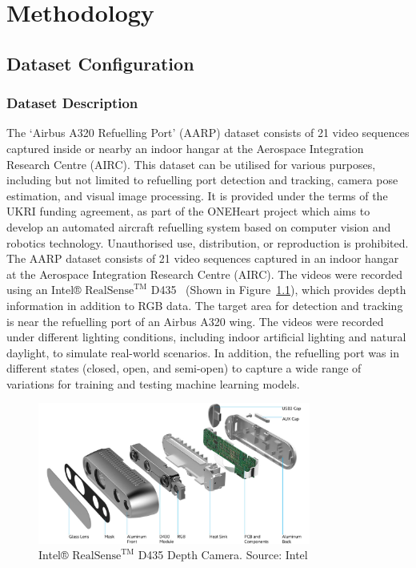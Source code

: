 \documentclass[12pt,oneside]{book} %
\begin{document}
\chapter{Methodology}\label{chap:methodology}
\section{Dataset Configuration}
\subsection{Dataset Description}
The `Airbus A320 Refuelling Port' (AARP) dataset consists of 21 video sequences
captured inside or nearby an indoor hangar at the Aerospace Integration
Research Centre (AIRC). This dataset can be utilised for various purposes,
including but not limited to refuelling port detection and tracking, camera
pose estimation, and visual image processing. It is provided under the terms of
the UKRI funding agreement, as part of the ONEHeart project which aims to
develop an automated aircraft refuelling system based on computer vision and
robotics technology. Unauthorised use, distribution, or reproduction is
prohibited. The AARP dataset consists of 21 video sequences captured in an
indoor hangar at the Aerospace Integration Research Centre (AIRC). The videos
were recorded using an Intel® ${\text{RealSense}}^{\text{TM}}$
D435~\cite{IntelRealSense} (Shown in Figure~\ref{fig:intel-realsense-d435}),
which provides depth information in addition to RGB data. The target area for
detection and tracking is near the refuelling port of an Airbus A320 wing. The
videos were recorded under different lighting conditions, including indoor
artificial lighting and natural daylight, to simulate real-world scenarios. In
addition, the refuelling port was in different states (closed, open, and
semi-open) to capture a wide range of variations for training and testing
machine learning models.

\begin{figure}[H]
    \centering
    \includegraphics[width=0.8\textwidth]{figures/depth-camera-d435_details.jpg}
    \caption{Intel® ${\text{RealSense}}^{\text{TM}}$ D435 Depth Camera. Source: Intel}\label{fig:intel-realsense-d435}
\end{figure}
\end{document}
